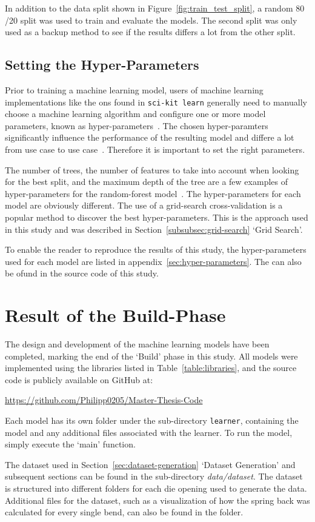 In addition to the data split shown in Figure~\ref{fig:train_test_split}, a random 80
/20 split was used to train and evaluate the models.
The second split was only used as a backup method to see if the results differs a lot from the other split.

\subsection{Setting the Hyper-Parameters}\label{subsec:hyper-parameters}
Prior to training a machine learning model, users of machine learning implementations like the ons found in
\texttt{sci-kit learn} generally need to manually choose a machine learning algorithm and configure one or more model
parameters, known as hyper-parameters~\cite[pp. 1]{claesen2015hyperparameter}.
The chosen hyper-paramters significantly influence the performance of the resulting model and differe a lot from use
case to use case~\cite[pp. 1]{claesen2015hyperparameter}.
Therefore it is important to set the right parameters.


The number of trees, the number of features to take into account when looking for the best split, and the maximum
depth of the tree are a few examples of hyper-parameters for the random-forest model~\cite{scikit-learn}.
The hyper-parameters for each model are obviously different.
The use of a grid-search cross-validation is a popular method to discover the best hyper-parameters.
This is the approach used in this study and was described in Section~\ref{subsubsec:grid-search} `Grid Search'.

To enable the reader to reproduce the results of this study, the hyper-parameters used for each model are listed in
appendix~\ref{sec:hyper-parameters}.
The can also be ofund in the source code of this study.


\section{Result of the Build-Phase}\label{sec:results-build-phase}

The design and development of the machine learning models have been completed, marking the end of the `Build' phase
in this study.
All models were implemented using the libraries listed in Table~\ref{table:libraries}, and the source
code is publicly available on GitHub at:

\url{https://github.com/Philipp0205/Master-Thesis-Code}

Each model has its own folder under the sub-directory \texttt{learner}, containing the model and any additional files
associated with the learner. To run the model, simply execute the `main' function.

The dataset used in Section~\ref{sec:dataset-generation} `Dataset Generation' and subsequent sections can be found in
the sub-directory \textit{data/dataset}. The dataset is structured into different folders for each die opening used
to generate the data. Additional files for the dataset, such as a visualization of how the spring back was calculated
for every single bend, can also be found in the folder.
